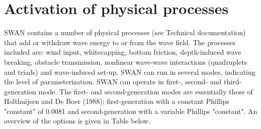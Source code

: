 \documentclass[12pt]{book}
\begin{document}
\section{Activation of physical processes}
SWAN contains a number of physical processes (see Technical documentation) that add or withdraw wave energy to or
from the wave field. The processes included are: wind input, whitecapping, bottom friction, depth-induced
wave breaking, obstacle transmission, nonlinear wave-wave interactions (quadruplets and triads) and
wave-induced set-up. SWAN can run in several modes, indicating the level of parameterization. SWAN can operate
in first-, second- and third-generation mode. The first- and second-generation modes are essentially those
of Holthuijsen and De Boer (1988); first-generation with a constant Phillips "constant" of 0.0081 and
second-generation with a variable Phillips "constant". An overview of the options is given in Table below.
\end{document}
